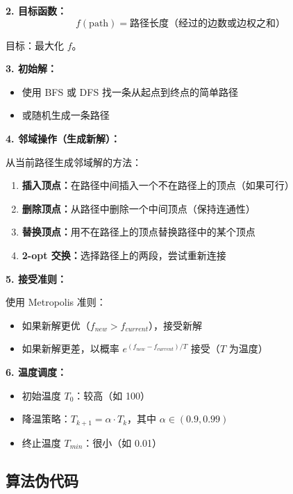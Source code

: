\documentclass[UTF8,12pt,a4paper]{ctexart}
\begin{document}
\textbf{2. 目标函数：}
$$f(\text{path}) = \text{路径长度（经过的边数或边权之和）}$$

目标：最大化 $f$。

\textbf{3. 初始解：}
\begin{itemize}
	\item 使用 BFS 或 DFS 找一条从起点到终点的简单路径
	\item 或随机生成一条路径
\end{itemize}

\textbf{4. 邻域操作（生成新解）：}

从当前路径生成邻域解的方法：
\begin{enumerate}
	\item \textbf{插入顶点：}在路径中间插入一个不在路径上的顶点（如果可行）
	\item \textbf{删除顶点：}从路径中删除一个中间顶点（保持连通性）
	\item \textbf{替换顶点：}用不在路径上的顶点替换路径中的某个顶点
	\item \textbf{2-opt 交换：}选择路径上的两段，尝试重新连接
\end{enumerate}

\textbf{5. 接受准则：}

使用 Metropolis 准则：
\begin{itemize}
	\item 如果新解更优（$f_{new} > f_{current}$），接受新解
	\item 如果新解更差，以概率 $e^{(f_{new} - f_{current}) / T}$ 接受（$T$ 为温度）
\end{itemize}

\textbf{6. 温度调度：}
\begin{itemize}
	\item 初始温度 $T_0$：较高（如 100）
	\item 降温策略：$T_{k+1} = \alpha \cdot T_k$，其中 $\alpha \in (0.9, 0.99)$
	\item 终止温度 $T_{min}$：很小（如 0.01）
\end{itemize}

\subsection*{算法伪代码}
\end{document}
